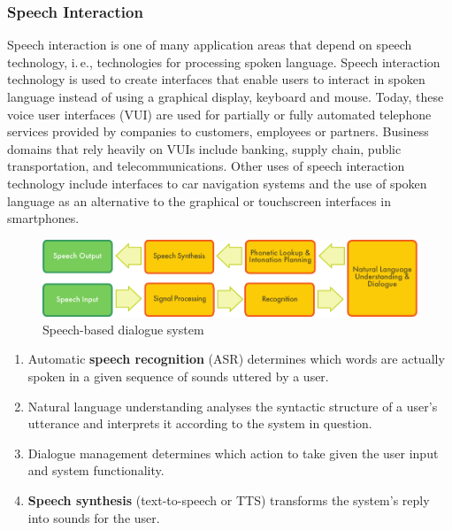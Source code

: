 \documentclass[]{../../metanetpaper}
\begin{document}
\begin{multicols}{2}
\subsubsection{Speech Interaction}

Speech interaction is one of many application areas that depend on speech technology, i.\,e., technologies for processing spoken language. Speech interaction technology is used to create interfaces that enable users to interact in spoken language instead of using a graphical display, keyboard and mouse.  Today, these voice user interfaces (VUI) are used for partially or fully automated telephone services provided by companies to customers, employees or partners. Business domains that rely heavily on VUIs include banking, supply chain, public transportation, and telecommunications. Other uses of speech interaction technology include interfaces to car navigation systems and the use of spoken language as an alternative to the graphical or touchscreen interfaces in smartphones.

\begin{figure}[htb]
  \center
  \includegraphics[width=\textwidth]{../_media/english/simple_speech-based_dialogue_architecture}
  \caption{Speech-based dialogue system}
  \label{fig:dialoguearch_en}
\end{figure}

\begin{enumerate}
\item Automatic \textbf{speech recognition} (ASR) determines which words are actually spoken in a given sequence of sounds uttered by a user.  
\item Natural language understanding analyses the syntactic structure of a user’s utterance and interprets it according to the system in question.
\item Dialogue management determines which action to take given the user input and system functionality.   
\item \textbf{Speech synthesis} (text-to-speech or TTS) transforms the system’s reply into sounds for the user.
\end{enumerate}


\end{multicols}
\end{document}
